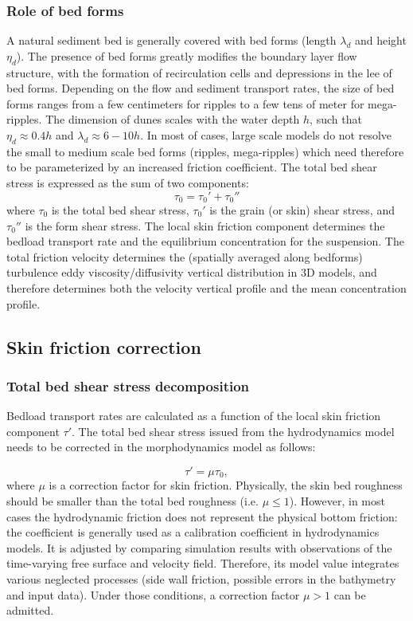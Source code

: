 \subsubsection{Role of bed forms}
A natural sediment bed is generally covered with bed forms (length $\lambda_d$
and height $\eta_d$). The presence of bed forms greatly modifies the boundary
layer flow structure, with the formation of recirculation cells and
depressions in the lee of bed forms.
Depending on the flow and sediment transport rates, the size of bed
forms ranges from a few centimeters for ripples to a few tens of meter for
mega-ripples. The dimension of dunes scales with the water depth $h$, such that $\eta_d
\approx 0.4 h$ and  $\lambda_d\approx 6-10 h$. 
In most of cases, large scale models do not resolve the small to medium scale
bed forms (ripples, mega-ripples) which need therefore to be parameterized
by an increased friction coefficient. The total bed shear stress is expressed 
as the sum of two components: 
\begin{equation}\label{eq:taupp}
\tau_0 = \tau_0' + \tau_0''
\end{equation}
where $\tau_0$ is the total bed shear stress, $\tau_0'$ is the grain (or skin) shear stress, 
and $\tau_0''$ is the form shear stress.
The local skin friction component determines the bedload transport rate and
the equilibrium concentration for the suspension. The total friction
velocity determines the (spatially averaged along bedforms) turbulence eddy
viscosity/diffusivity vertical distribution in 3D models, and therefore
determines both the velocity vertical profile and the mean concentration profile.

\subsection{Skin friction correction}
\subsubsection{Total bed shear stress decomposition}
Bedload transport rates are calculated as a function of the local skin friction
component $\tau'$. The total bed shear stress issued from the hydrodynamics
model needs to be corrected in the morphodynamics model as follows:

\begin{equation}\label{eq:skinfriction}
\tau'= \mu \tau_0, 
\end{equation}
where $\mu$ is a correction factor for skin friction. Physically, the skin bed roughness should be smaller than the total bed
roughness (i.e. $\mu \leq 1$). However, in most cases the hydrodynamic
friction does not represent the physical bottom friction: the coefficient is
generally used as a calibration coefficient in hydrodynamics models. It is
adjusted by comparing simulation results with observations of the time-varying free
surface and velocity field. Therefore, its model value integrates various
neglected processes (side wall friction, possible errors in the bathymetry
and input data). Under those conditions, a correction factor $\mu > 1$ can be admitted.

